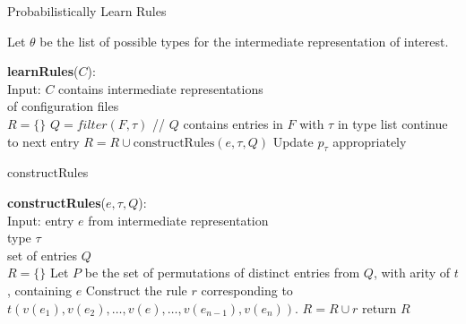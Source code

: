 \begin{algorithm}
\caption{Probabilistically Learn Rules}
  Let $\theta$ be the list of possible types for the intermediate representation of interest.
  \begin{algorithmic}[1]
  \State \textbf{learnRules}($C$):\\

    Input: $C$ contains intermediate representations\\ 
     \qquad \enspace \enspace of configuration files\\

        \State $R = \{\}$
        \State $Q = filter(F,\tau)$ 
        \State // $Q$ contains entries in $F$ with $\tau$ in type list
                        \State continue to next entry
                        \Else \enspace $R = R  \cup  \textrm{constructRules}(e, \tau, Q)$
               \EndIf
        \EndFor
     \State Update $p_{\tau}$ appropriately
     \EndFor
    \EndFor
  \end{algorithmic}
\end{algorithm}



\begin{algorithm}
\caption{constructRules}
  \begin{algorithmic}[1]
  \State \textbf{constructRules}($e, \tau, Q$):\\
    Input: entry $e$ from intermediate representation\\ 
     \qquad \enspace \enspace type $\tau$\\
     \qquad \enspace \enspace set of entries $Q$\\
     $R = \{\}$
      \State Let $P$ be the set of permutations of distinct entries from $Q$, with arity of $t$, containing $e$
      \State Construct the rule $r$ corresponding to $t(v(e_1), v(e_2), \ldots, v(e), \ldots, v(e_{n-1}), v(e_n))$.
        $R = R \cup r$
      \EndIf
     \EndFor
     \EndFor
     \State return $R$
  \end{algorithmic}
\end{algorithm}



